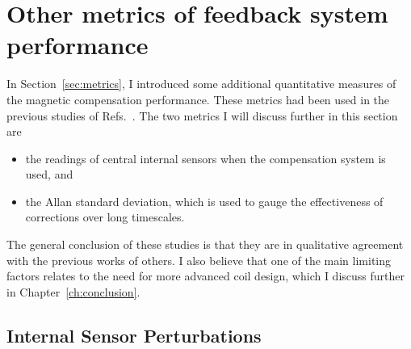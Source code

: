 
\section{Other metrics of feedback system performance}\label{sec:metrics_res}


In Section~\ref{sec:metrics}, I introduced some additional
quantitative measures of the magnetic compensation performance.  These
metrics had been used in the previous studies of
Refs.~\cite{bea,lins,rawlik}.  The two metrics I will discuss further in this section are
\begin{itemize}
\item the readings of central internal sensors when the compensation system is used, and
\item the Allan standard deviation, which is used to gauge the effectiveness of corrections over long timescales.
\end{itemize}
The general conclusion of these studies is that they are in
qualitative agreement with the previous works of others.  I also
believe that one of the main limiting factors relates to the need for
more advanced coil design, which I discuss further in
Chapter~\ref{ch:conclusion}.


\subsection{Internal Sensor Perturbations}

